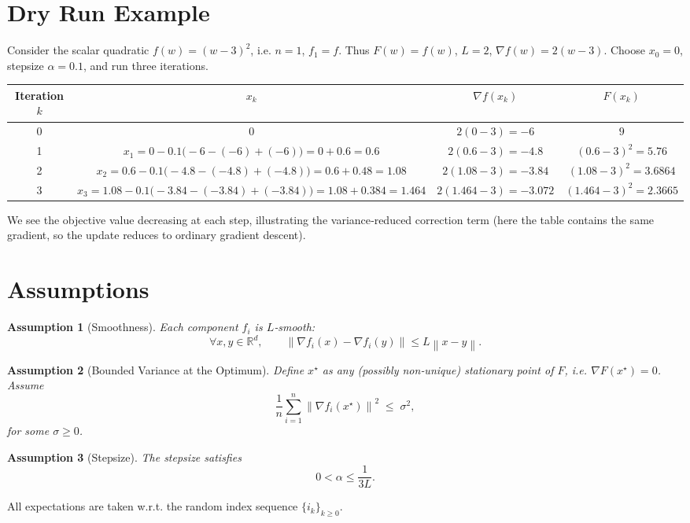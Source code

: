 \documentclass{article}
\newtheorem{assumption}{Assumption}
\newcommand{\R}{\mathbb{R}}
\newcommand{\norm}[1]{\left\lVert#1\right\rVert}
\begin{document}
\section*{Dry Run Example}
Consider the scalar quadratic $f(w)=(w-3)^{2}$, i.e. $n=1$, $f_{1}=f$.  
Thus $F(w)=f(w)$, $L=2$, $\nabla f(w)=2(w-3)$.  
Choose $x_{0}=0$, stepsize $\alpha=0.1$, and run three iterations.

\begin{center}
\begin{tabular}{c|c|c|c}
Iteration $k$ & $x_k$ & $\nabla f(x_k)$ & $F(x_k)$ \\ \hline
0 & $0$ & $2(0-3)=-6$ & $9$ \\ 
1 & $x_{1}=0-0.1\bigl(-6-(-6)+(-6)\bigr)=0+0.6=0.6$ & $2(0.6-3)=-4.8$ & $(0.6-3)^2=5.76$\\
2 & $x_{2}=0.6-0.1\bigl(-4.8-(-4.8)+(-4.8)\bigr)=0.6+0.48=1.08$ & $2(1.08-3)=-3.84$ & $(1.08-3)^2=3.6864$\\
3 & $x_{3}=1.08-0.1\bigl(-3.84-(-3.84)+(-3.84)\bigr)=1.08+0.384=1.464$ & $2(1.464-3)=-3.072$ & $(1.464-3)^2=2.3665$\\
\end{tabular}
\end{center}
We see the objective value decreasing at each step, illustrating the variance‑reduced correction term (here the table contains the same gradient, so the update reduces to ordinary gradient descent).

\section*{Assumptions}
\begin{assumption}[Smoothness]\label{as:smooth}
Each component $f_i$ is $L$‑smooth:
\[
\forall x,y\in\R^{d},\qquad 
\norm{\nabla f_i(x)-\nabla f_i(y)}\le L\norm{x-y}.
\]
\end{assumption}
\begin{assumption}[Bounded Variance at the Optimum]\label{as:variance}
Define $x^{\star}$ as any (possibly non‑unique) stationary point of $F$, i.e. $\nabla F(x^{\star})=0$.
Assume
\[
\frac{1}{n}\sum_{i=1}^{n}\norm{\nabla f_i(x^{\star})}^{2}\;\le\;\sigma^{2},
\]
for some $\sigma\ge 0$.
\end{assumption}
\begin{assumption}[Stepsize]\label{as:stepsize}
The stepsize satisfies 
\[
0<\alpha\le\frac{1}{3L}.
\]
\end{assumption}
All expectations are taken w.r.t. the random index sequence $\{i_k\}_{k\ge0}$.
\end{document}
